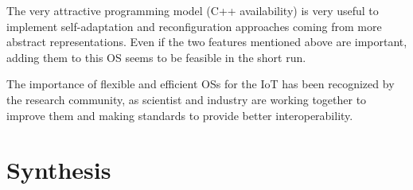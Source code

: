 The very attractive programming model (C++ availability) is very useful to implement self-adaptation and reconfiguration approaches coming from more abstract representations.
Even if the two features mentioned above are important, adding them to this OS seems to be feasible in the short run.

The importance of flexible and efficient OSs for the IoT has been recognized by the research community, as scientist and industry are working together to improve them and making standards to provide better interoperability\cite{hahm2015OSIOT}.




\section{Synthesis}

